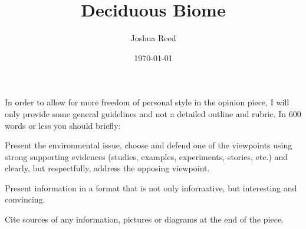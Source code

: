 \documentclass[paper=a4, fontsize=11pt]{article}
\title{Deciduous Biome}
\author{Joshua Reed}
\date{\today}
\begin{document}
\maketitle
\section{}

In order to allow for more freedom of personal style in the opinion piece, 
I will only provide some general guidelines and not a detailed outline and rubric. 
In 600 words or less you should briefly:

Present the environmental issue, choose and defend one of the viewpoints 
using strong supporting evidences (studies, examples, experiments, stories, etc.) and 
clearly, but respectfully, address the opposing viewpoint.

Present information in a format that is not only informative, but interesting and convincing.

Cite sources of any information, pictures or diagrams at the end of the piece.
\end{document}
